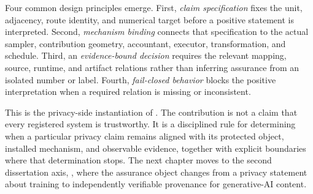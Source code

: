 Four common design principles emerge.  First, \emph{claim specification} fixes the
unit, adjacency, route identity, and numerical target before a positive statement
is interpreted.  Second, \emph{mechanism binding} connects that specification to
the actual sampler, contribution geometry, accountant, executor, transformation,
and schedule.  Third, an \emph{evidence-bound decision} requires the relevant
mapping, source, runtime, and artifact relations rather than inferring assurance
from an isolated number or label.  Fourth, \emph{fail-closed behavior} blocks the
positive interpretation when a required relation is missing or inconsistent.

This is the privacy-side instantiation of \ClaimAlignedAssurance{}.  The
contribution is not a claim that every registered system is trustworthy.  It is a
disciplined rule for determining when a particular privacy claim remains aligned
with its protected object, installed mechanism, and observable evidence, together
with explicit boundaries where that determination stops.  The next chapter moves
to the second dissertation axis, \SecurePublicVerification{}, where the assurance
object changes from a privacy statement about training to independently
verifiable provenance for generative-AI content.
